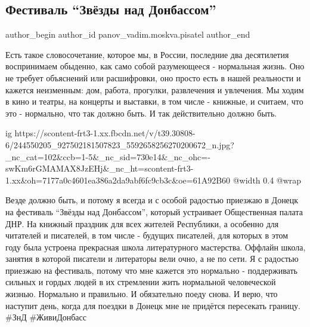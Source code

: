  
 
 
 
 
 
\subsection{Фестиваль \enquote{Звёзды над Донбассом}}
\label{sec:10_10_2021.fb.panov_vadim.moskva.pisatel.1.festival_zvezdy_nad_donbassom}
 
\ifcmt
 author_begin
   author_id panov_vadim.moskva.pisatel
 author_end
\fi

Есть такое словосочетание, которое мы, в России, последние два десятилетия
воспринимаем обыденно, как само собой разумеющееся - нормальная жизнь. Оно не
требует объяснений или расшифровки, оно просто есть в нашей реальности и
кажется неизменным: дом, работа, прогулки, развлечения и увлечения. Мы ходим в
кино и театры, на концерты и выставки, в том числе - книжные, и считаем, что
это - нормально, что так должно быть. И так действительно должно быть. 

\ifcmt
  ig https://scontent-frt3-1.xx.fbcdn.net/v/t39.30808-6/244550205_927502181507823_5592658256270200672_n.jpg?_nc_cat=102&ccb=1-5&_nc_sid=730e14&_nc_ohc=-swKm6rGMAMAX8JzEHj&_nc_ht=scontent-frt3-1.xx&oh=7177a0c4601ea386a2da9abf6fc9cb3c&oe=61A92B60
  @width 0.4
  @wrap 
\fi

Везде должно быть, и потому я всегда и с особой радостью приезжаю в Донецк на
фестиваль \enquote{Звёзды над Донбассом}, который устраивает Общественная
палата ДНР.  На книжный праздник для всех жителей Республики, а особенно для
читателей и писателей, в том числе - будущих писателей, для которых в этом году
была устроена прекрасная школа литературного мастерства. Оффлайн школа, занятия
в которой писатели и литераторы вели очно, а не по сети. Я с радостью приезжаю
на фестиваль, потому что мне кажется это нормально - поддерживать сильных и
гордых людей в их стремлении жить нормальной человеческой жизнью. Нормально и
правильно. И обязательно поеду снова. И верю, что наступит день, когда для
поездки в Донецк мне не придётся пересекать границу. \#ЗнД \#ЖивиДонбасс

